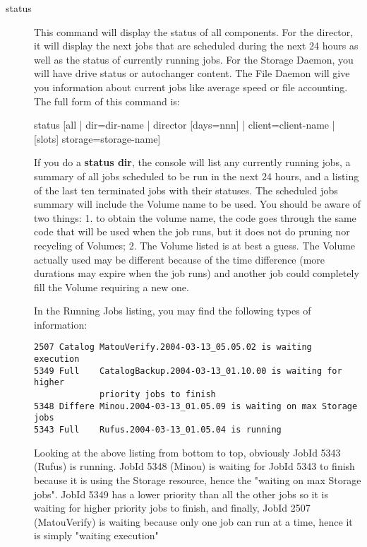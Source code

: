 \begin{description}
\item [status]

   This command will display the status of all components. For the director, it
   will display the next jobs that are scheduled during the next 24 hours as
   well as the status of currently running jobs. For the Storage Daemon, you
   will have drive status or autochanger content. The File Daemon will give you
   information about current jobs like average speed or file accounting. The
   full form of this command is:

status [all | dir=\lt{}dir-name\gt{} | director [days=nnn] | 
  client=\lt{}client-name\gt{} | [slots] storage=\lt{}storage-name\gt{}]

   If you do a {\bf status dir}, the console will list any currently
   running jobs, a summary of all jobs scheduled to be run in the next 24
   hours, and a listing of the last ten terminated jobs with their statuses.
   The scheduled jobs summary will include the Volume name to be used.  You
   should be aware of two things: 1. to obtain the volume name, the code
   goes through the same code that will be used when the job runs, but it
   does not do pruning nor recycling of Volumes; 2.  The Volume listed is
   at best a guess.  The Volume actually used may be different because of
   the time difference (more durations may expire when the job runs) and
   another job could completely fill the Volume requiring a new one.

   In the Running Jobs listing, you may find the following types of
   information:


\footnotesize
\begin{verbatim}
2507 Catalog MatouVerify.2004-03-13_05.05.02 is waiting execution
5349 Full    CatalogBackup.2004-03-13_01.10.00 is waiting for higher
             priority jobs to finish
5348 Differe Minou.2004-03-13_01.05.09 is waiting on max Storage jobs
5343 Full    Rufus.2004-03-13_01.05.04 is running
\end{verbatim}
\normalsize

   Looking at the above listing from bottom to top, obviously JobId 5343
   (Rufus) is running.  JobId 5348 (Minou) is waiting for JobId 5343 to
   finish because it is using the Storage resource, hence the "waiting on
   max Storage jobs".  JobId 5349 has a lower priority than all the other
   jobs so it is waiting for higher priority jobs to finish, and finally,
   JobId 2507 (MatouVerify) is waiting because only one job can run at a
   time, hence it is simply "waiting execution"


\end{description}
